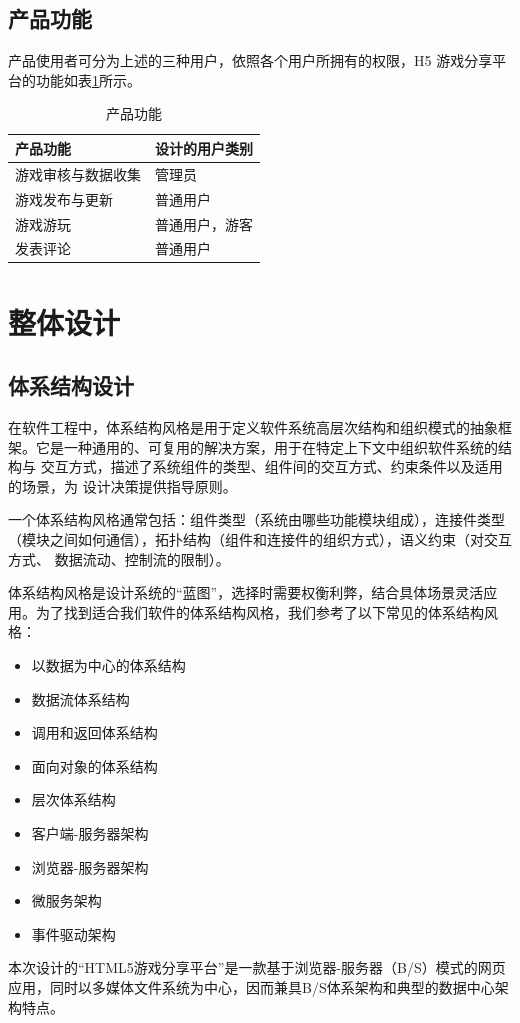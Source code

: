\documentclass[12pt]{ctexart} %
\begin{document}
\subsection{产品功能}
产品使用者可分为上述的三种用户，依照各个用户所拥有的权限，H5 游戏分享平台的功能如表\ref{tab:productfunction}所示。

  \begin{table}[htbp]
      \centering
      \begin{tabular}{|p{3cm}|p{3cm}|}
          \hline
          产品功能 & 设计的用户类别\\
          \hline
          游戏审核与数据收集 & 管理员\\
          \hline
          游戏发布与更新 & 普通用户\\
          \hline
          游戏游玩 & 普通用户，游客\\
          \hline
          发表评论 & 普通用户\\
          \hline
      \end{tabular}
      \caption{产品功能}
      \label{tab:productfunction}
  \end{table}

\section{整体设计}
\subsection{体系结构设计}
在软件工程中，体系结构风格是用于定义软件系统高层次结构和组织模式的抽象框
架。它是一种通用的、可复用的解决方案，用于在特定上下文中组织软件系统的结构与
交互方式，描述了系统组件的类型、组件间的交互方式、约束条件以及适用的场景，为
设计决策提供指导原则。

一个体系结构风格通常包括：组件类型（系统由哪些功能模块组成），连接件类型
（模块之间如何通信），拓扑结构（组件和连接件的组织方式），语义约束（对交互方式、
数据流动、控制流的限制）。

体系结构风格是设计系统的“蓝图”，选择时需要权衡利弊，结合具体场景灵活应
用。为了找到适合我们软件的体系结构风格，我们参考了以下常见的体系结构风格：
\begin{itemize}
  \item 以数据为中心的体系结构
  \item 数据流体系结构
  \item 调用和返回体系结构
  \item 面向对象的体系结构
  \item 层次体系结构
  \item 客户端-服务器架构
  \item 浏览器-服务器架构
  \item 微服务架构
  \item 事件驱动架构
\end{itemize}
本次设计的“HTML5游戏分享平台”是一款基于浏览器-服务器（B/S）模式的网页应用，同时以多媒体文件系统为中心，因而兼具B/S体系架构和典型的数据中心架构特点。
\end{document}
